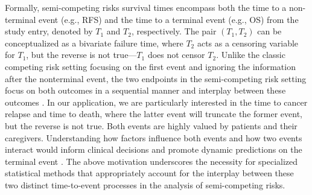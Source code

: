 \documentclass[APA,Times1COL]{WileyNJDv5} %
\theoremstyle{plain}
\begin{document}
Formally, semi-competing risks survival times encompass both the time to a non-terminal event (e.g., RFS) and the time to a terminal event (e.g., OS) from the study entry, denoted by $T_1$ and $T_2$, respectively. The pair $(T_{1},T_{2})$ can be conceptualized as a bivariate failure time, where $T_{2}$ acts as a censoring variable for $T_{1}$, but the reverse is not true—$T_{1}$ does not censor $T_{2}$. %
Unlike the classic competing risk setting \citep{fine1999competing,young2020} focusing on the first event and ignoring the information after the nonterminal event, the two endpoints in the semi-competing risk setting focus on both outcomes in a sequential manner and interplay between these outcomes \citep{varadhan2014semicompeting}. In our application, we are particularly interested in the time to cancer relapse and time to death, where the latter event will truncate the former event, but the reverse is not true. Both events are highly valued by patients and their caregivers. 
Understanding how factors influence both events and how two events interact would inform clinical decisions and promote dynamic predictions on the terminal event \citep{li2016flexible}. The above motivation underscores the necessity for specialized statistical methods that appropriately account for the interplay between these two distinct time-to-event processes in the analysis of semi-competing risks.


\end{document}
